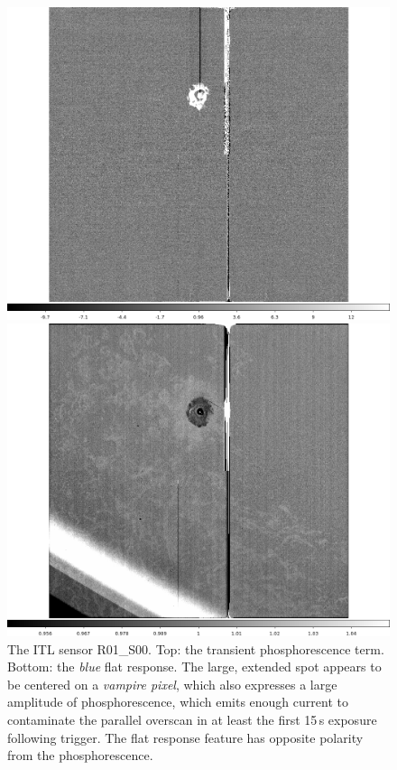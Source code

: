 \begin{figure}[!htbp]
\centering
\begin{minipage}{1.0\textwidth}    
  \centering
  \includegraphics[width=.6\linewidth]{figures/phosphorescence-survey/stains_phos_R01_S00.png}    
\end{minipage}
\begin{minipage}{1.0\textwidth}
  \centering
  \includegraphics[width=.6\linewidth]{figures/phosphorescence-survey/stains_abs_R01_S00.png}
\end{minipage}
\caption{The ITL sensor R01\_S00. Top: the transient phosphorescence term. Bottom: the {\it blue} flat response. The large, extended spot appears to be centered on a {\it vampire pixel}, which also expresses a large amplitude of phosphorescence, which emits enough current to contaminate the parallel overscan in at least the first 15\,s exposure following trigger. The flat response feature has opposite polarity from the phosphorescence.}
\label{fig:phos:stains:R01S00}
\end{figure}


